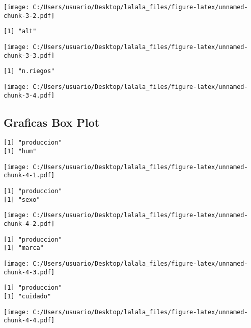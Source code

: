 \documentclass[]{article}
\begin{document}
\texttt{[image: C:/Users/usuario/Desktop/lalala\_files/figure-latex/unnamed-chunk-3-2.pdf]}

\begin{verbatim}
[1] "alt"
\end{verbatim}

\texttt{[image: C:/Users/usuario/Desktop/lalala\_files/figure-latex/unnamed-chunk-3-3.pdf]}

\begin{verbatim}
[1] "n.riegos"
\end{verbatim}

\texttt{[image: C:/Users/usuario/Desktop/lalala\_files/figure-latex/unnamed-chunk-3-4.pdf]}

\subsection{Graficas Box Plot}\label{graficas-box-plot}

\begin{verbatim}
[1] "produccion"
[1] "hum"
\end{verbatim}

\texttt{[image: C:/Users/usuario/Desktop/lalala\_files/figure-latex/unnamed-chunk-4-1.pdf]}

\begin{verbatim}
[1] "produccion"
[1] "sexo"
\end{verbatim}

\texttt{[image: C:/Users/usuario/Desktop/lalala\_files/figure-latex/unnamed-chunk-4-2.pdf]}

\begin{verbatim}
[1] "produccion"
[1] "marca"
\end{verbatim}

\texttt{[image: C:/Users/usuario/Desktop/lalala\_files/figure-latex/unnamed-chunk-4-3.pdf]}

\begin{verbatim}
[1] "produccion"
[1] "cuidado"
\end{verbatim}

\texttt{[image: C:/Users/usuario/Desktop/lalala\_files/figure-latex/unnamed-chunk-4-4.pdf]}
\end{document}
